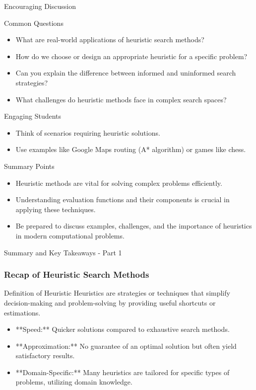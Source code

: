 \documentclass[aspectratio=169]{beamer}
\begin{document}
\begin{frame}[fragile]{Encouraging Discussion}
    \begin{block}{Common Questions}
        \begin{itemize}
            \item What are real-world applications of heuristic search methods?
            \item How do we choose or design an appropriate heuristic for a specific problem?
            \item Can you explain the difference between informed and uninformed search strategies?
            \item What challenges do heuristic methods face in complex search spaces?
        \end{itemize}
    \end{block}

    \begin{block}{Engaging Students}
        \begin{itemize}
            \item Think of scenarios requiring heuristic solutions.
            \item Use examples like Google Maps routing (A* algorithm) or games like chess.
        \end{itemize}
    \end{block}
\end{frame}

\begin{frame}[fragile]{Summary Points}
    \begin{itemize}
        \item Heuristic methods are vital for solving complex problems efficiently.
        \item Understanding evaluation functions and their components is crucial in applying these techniques.
        \item Be prepared to discuss examples, challenges, and the importance of heuristics in modern computational problems.
    \end{itemize}
\end{frame}

\begin{frame}[fragile]{Summary and Key Takeaways - Part 1}
    \frametitle{Recap of Heuristic Search Methods}
    \begin{block}{Definition of Heuristic}
        Heuristics are strategies or techniques that simplify decision-making and problem-solving by providing useful shortcuts or estimations.
    \end{block}
    \begin{itemize}
        \item **Speed:** Quicker solutions compared to exhaustive search methods.
        \item **Approximation:** No guarantee of an optimal solution but often yield satisfactory results.
        \item **Domain-Specific:** Many heuristics are tailored for specific types of problems, utilizing domain knowledge.
    \end{itemize}
\end{frame}
\end{document}
